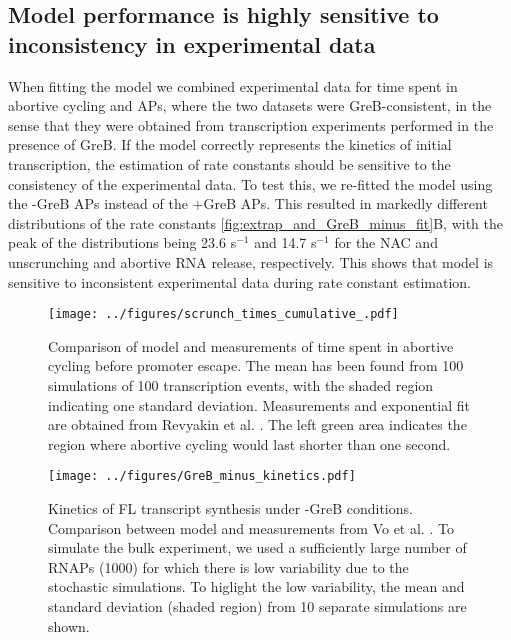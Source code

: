 \subsection{Model performance is highly sensitive to inconsistency in experimental data}
When fitting the model we combined experimental data for time spent in
abortive cycling and APs, where the two datasets were GreB-consistent, in the
sense that they were obtained from transcription experiments performed in the
presence of GreB. If the model correctly represents the kinetics of initial
transcription, the estimation of rate constants should be sensitive to the
consistency of the experimental data. To test this, we re-fitted the
model using the -GreB APs instead of the +GreB APs. This resulted in markedly
different distributions of the rate constants
\ref{fig:extrap_and_GreB_minus_fit}B, with the peak of the distributions being
23.6 s$^{-1}$ and 14.7 s$^{-1}$ for the NAC and unscrunching and abortive RNA
release, respectively. This shows that model is sensitive to inconsistent
experimental data during rate constant estimation.

\begin{figure}
    \begin{center}
      \texttt{[image: ../figures/scrunch\_times\_cumulative\_.pdf]}
    \end{center}
    \caption{Comparison of model and measurements of time spent in abortive
        cycling before promoter escape. The mean has been found from 100
        simulations of 100 transcription events, with the shaded region
        indicating one standard deviation. Measurements and exponential fit
        are obtained from Revyakin et al. \cite{revyakin_abortive_2006}. The
        left green area indicates the region where abortive cycling would last
        shorter than one second.}
\label{fig:revyakin_fit}
\end{figure}

\begin{figure}
    \begin{center}
        \texttt{[image: ../figures/GreB\_minus\_kinetics.pdf]}
    \end{center}
    \caption{Kinetics of FL transcript synthesis under -GreB conditions.
      Comparison between model and measurements from Vo
      et al. \cite{vo_vitro_2003-1}. To simulate the bulk experiment, we
      used a sufficiently large number of RNAPs (1000) for which there is low
      variability due to the stochastic simulations. To higlight the low
      variability, the mean and standard deviation (shaded region) from 10
      separate simulations are shown.}
\label{fig:vo_comparison}
\end{figure}
